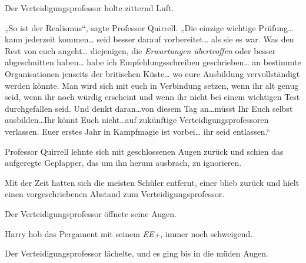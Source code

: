 Der Verteidigungsprofessor holte zitternd Luft.

„So ist der Realismus“, sagte Professor Quirrell. „Die einzige wichtige Prüfung… kann jederzeit kommen… seid besser darauf vorbereitet… als sie es war. Was den Rest von euch angeht… diejenigen, die \emph{Erwartungen übertroffen} oder besser abgeschnitten haben… habe ich Empfehlungsschreiben geschrieben… an bestimmte Organisationen jenseits der britischen Küste… wo eure Ausbildung vervollständigt werden könnte. Man wird sich mit euch in Verbindung setzen, wenn ihr alt genug seid, wenn ihr noch würdig erscheint und wenn ihr nicht bei einem wichtigen Test durchgefallen seid. Und denkt daran…von diesem Tag an…müsst Ihr Euch selbst ausbilden…Ihr könnt Euch nicht…auf zukünftige Verteidigungsprofessoren verlassen. Euer erstes Jahr in Kampfmagie ist vorbei… ihr seid entlassen.“

Professor Quirrell lehnte sich mit geschlossenen Augen zurück und schien das aufgeregte Geplapper, das um ihn herum ausbrach, zu ignorieren.

Mit der Zeit hatten sich die meisten Schüler entfernt, einer blieb zurück und hielt einen vorgeschriebenen Abstand zum Verteidigungsprofessor.

Der Verteidigungsprofessor öffnete seine Augen.

Harry hob das Pergament mit seinem \emph{EE+}, immer noch schweigend.

Der Verteidigungsprofessor lächelte, und es ging bis in die müden Augen.

